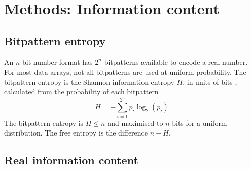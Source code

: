 \section{Methods: Information content}
\label{sec:compression_methods_information_content}
\subsection{Bitpattern entropy}

An $n$-bit number format has $2^n$ bitpatterns available to encode a real number.
For most data arrays, not all bitpatterns are used at uniform probability. The bitpattern entropy is the Shannon information entropy $H$,
in units of bits \citep{Shannon1948}, calculated from the probability of each bitpattern 
	\begin{equation}
	H = - \sum_{i=1}^{2^n} p_i \log_2(p_i)
	\end{equation}
The bitpattern entropy is $H \leq n$  and maximised to $n$ bits for a uniform distribution. The free entropy is the difference $n-H$.

\subsection{Real information content}

